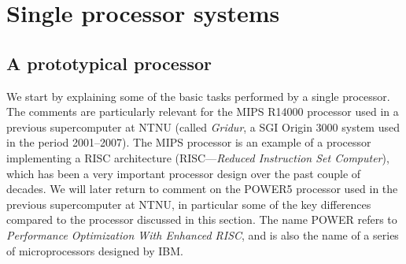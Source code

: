 \chapter{Single processor systems}

\section{A prototypical processor}

We start by explaining some of the basic tasks performed by a single processor.
The comments are particularly relevant for the MIPS R14000 processor used in a
previous supercomputer at NTNU (called \emph{Gridur}, a SGI Origin 3000 system
used in the period 2001--2007). The MIPS processor is an example of a processor
implementing a RISC architecture (RISC---\emph{Reduced Instruction Set
Computer}), which has been a very important processor design over the past
couple of decades. We will later return to comment on the POWER5 processor
used in the previous supercomputer at NTNU, in particular some of the key
differences compared to the processor discussed in this section. The name POWER
refers to {\em Performance Optimization With Enhanced RISC}, and is also the
name of a series of microprocessors designed by IBM.

